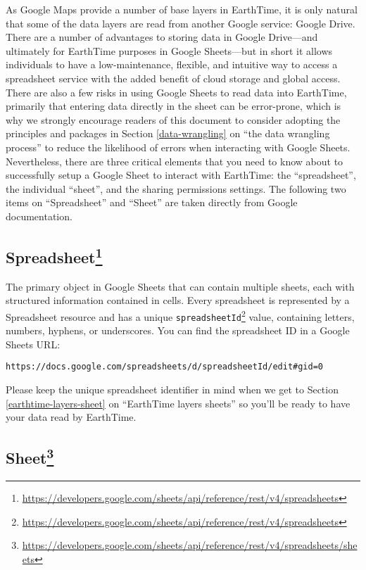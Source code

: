 \documentclass[
]{book}
\renewcommand{\href}[2]{#2\footnote{\url{#1}}}
\begin{document}
As Google Maps provide a number of base layers in EarthTime, it is only natural that some of the data layers are read from another Google service: Google Drive. There are a number of advantages to storing data in Google Drive---and ultimately for EarthTime purposes in Google Sheets---but in short it allows individuals to have a low-maintenance, flexible, and intuitive way to access a spreadsheet service with the added benefit of cloud storage and global access. There are also a few risks in using Google Sheets to read data into EarthTime, primarily that entering data directly in the sheet can be error-prone, which is why we strongly encourage readers of this document to consider adopting the principles and packages in Section \ref{data-wrangling} on ``the data wrangling process'' to reduce the likelihood of errors when interacting with Google Sheets. Nevertheless, there are three critical elements that you need to know about to successfully setup a Google Sheet to interact with EarthTime: the ``spreadsheet'', the individual ``sheet'', and the sharing permissions settings. The following two items on ``Spreadsheet'' and ``Sheet'' are taken directly from Google documentation.

\hypertarget{spreadsheet}{%
\subsection*{\texorpdfstring{\href{https://developers.google.com/sheets/api/reference/rest/v4/spreadsheets}{Spreadsheet}}{Spreadsheet}}\label{spreadsheet}}


The primary object in Google Sheets that can contain multiple sheets, each with structured information contained in cells. Every spreadsheet is represented by a Spreadsheet resource and has a unique \href{https://developers.google.com/sheets/api/reference/rest/v4/spreadsheets}{\texttt{spreadsheetId}} value, containing letters, numbers, hyphens, or underscores. You can find the spreadsheet ID in a Google Sheets URL:

\texttt{https://docs.google.com/spreadsheets/d/spreadsheetId/edit\#gid=0}

Please keep the unique spreadsheet identifier in mind when we get to Section \ref{earthtime-layers-sheet} on ``EarthTime layers sheets'' so you'll be ready to have your data read by EarthTime.

\hypertarget{sheet}{%
\subsection*{\texorpdfstring{\href{https://developers.google.com/sheets/api/reference/rest/v4/spreadsheets/sheets}{Sheet}}{Sheet}}\label{sheet}}
\end{document}

